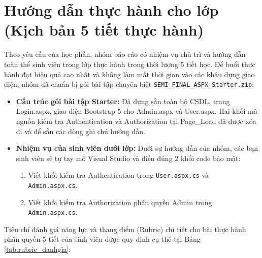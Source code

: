 \documentclass[12pt,a4paper]{report}
\begin{document}
\section{Hướng dẫn thực hành cho lớp (Kịch bản 5 tiết thực hành)}
Theo yêu cầu của học phần, nhóm báo cáo có nhiệm vụ chủ trì và hướng dẫn toàn thể sinh viên trong lớp thực hành trong thời lượng 5 tiết học. Để buổi thực hành đạt hiệu quả cao nhất và không làm mất thời gian vào các khâu dựng giao diện, nhóm đã chuẩn bị gói bài tập chuyên biệt \texttt{SEMI\_FINAL\_ASPX\_Starter.zip}:
\begin{itemize}
    \item \textbf{Cấu trúc gói bài tập Starter:} Đã dựng sẵn toàn bộ CSDL, trang Login.aspx, giao diện Bootstrap 5 cho Admin.aspx và User.aspx. Hai khối mã nguồn kiểm tra Authentication và Authorization tại Page\_Load đã được xóa đi và để sẵn các dòng ghi chú hướng dẫn.
    \item \textbf{Nhiệm vụ của sinh viên dưới lớp:} Dưới sự hướng dẫn của nhóm, các bạn sinh viên sẽ tự tay mở Visual Studio và điền đúng 2 khối code bảo mật:
    \begin{enumerate}
        \item Viết khối kiểm tra Authentication trong \texttt{User.aspx.cs} và \texttt{Admin.aspx.cs}.
        \item Viết khối kiểm tra Authorization phân quyền Admin trong \texttt{Admin.aspx.cs}.
    \end{enumerate}
\end{itemize}

Tiêu chí đánh giá năng lực và thang điểm (Rubric) chi tiết cho bài thực hành phân quyền 5 tiết của sinh viên được quy định cụ thể tại Bảng \ref{tab:rubric_danhgia}:
\end{document}

